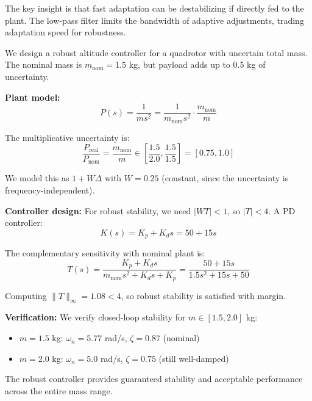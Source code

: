The key insight is that fast adaptation can be destabilizing if directly fed to the plant. The low-pass filter limits the bandwidth of adaptive adjustments, trading adaptation speed for robustness.

\begin{example}
\label{ex:robust_quadrotor}
We design a robust altitude controller for a quadrotor with uncertain total mass. The nominal mass is $m_{\text{nom}} = 1.5$ kg, but payload adds up to 0.5 kg of uncertainty.

\textbf{Plant model:}
\begin{equation}
P(s) = \frac{1}{ms^2} = \frac{1}{m_{\text{nom}}s^2} \cdot \frac{m_{\text{nom}}}{m}
\end{equation}

The multiplicative uncertainty is:
\begin{equation}
\frac{P_{\text{real}}}{P_{\text{nom}}} = \frac{m_{\text{nom}}}{m} \in \left[\frac{1.5}{2.0}, \frac{1.5}{1.5}\right] = [0.75, 1.0]
\end{equation}

We model this as $1 + W\Delta$ with $W = 0.25$ (constant, since the uncertainty is frequency-independent).

\textbf{Controller design:}
For robust stability, we need $|WT| < 1$, so $|T| < 4$. A PD controller:
\begin{equation}
K(s) = K_p + K_d s = 50 + 15s
\end{equation}

The complementary sensitivity with nominal plant is:
\begin{equation}
T(s) = \frac{K_p + K_d s}{m_{\text{nom}}s^2 + K_d s + K_p} = \frac{50 + 15s}{1.5s^2 + 15s + 50}
\end{equation}

Computing $\|T\|_\infty = 1.08 < 4$, so robust stability is satisfied with margin.

\textbf{Verification:}
We verify closed-loop stability for $m \in [1.5, 2.0]$ kg:
\begin{itemize}
    \item $m = 1.5$ kg: $\omega_n = 5.77$ rad/s, $\zeta = 0.87$ (nominal)
    \item $m = 2.0$ kg: $\omega_n = 5.0$ rad/s, $\zeta = 0.75$ (still well-damped)
\end{itemize}

The robust controller provides guaranteed stability and acceptable performance across the entire mass range.
\end{example}

